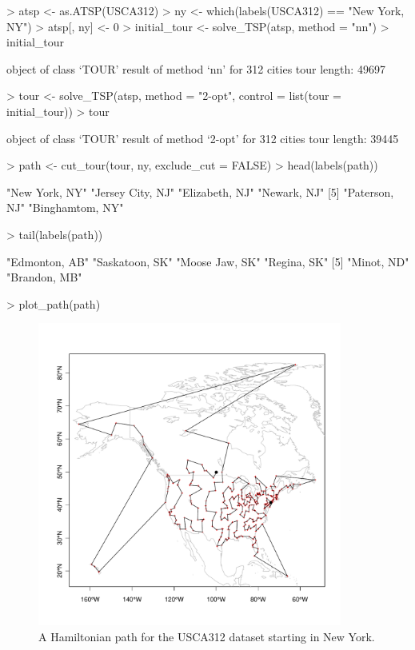 \documentclass[10pt,a4paper,fleqn]{article}
\begin{document}
\begin{Schunk}
\begin{Sinput}
> atsp <- as.ATSP(USCA312)
> ny <- which(labels(USCA312) == "New York, NY")
> atsp[, ny] <- 0
> initial_tour <- solve_TSP(atsp, method = "nn")
> initial_tour
\end{Sinput}
\begin{Soutput}
object of class ‘TOUR’ 
result of method ‘nn’ for 312 cities
tour length: 49697 
\end{Soutput}
\begin{Sinput}
> tour <- solve_TSP(atsp, method = "2-opt", control = list(tour = initial_tour))
> tour
\end{Sinput}
\begin{Soutput}
object of class ‘TOUR’ 
result of method ‘2-opt’ for 312 cities
tour length: 39445 
\end{Soutput}
\begin{Sinput}
> path <- cut_tour(tour, ny, exclude_cut = FALSE)
> head(labels(path))
\end{Sinput}
\begin{Soutput}
[1] "New York, NY"    "Jersey City, NJ" "Elizabeth, NJ"   "Newark, NJ"     
[5] "Paterson, NJ"    "Binghamtom, NY" 
\end{Soutput}
\begin{Sinput}
> tail(labels(path))
\end{Sinput}
\begin{Soutput}
[1] "Edmonton, AB"  "Saskatoon, SK" "Moose Jaw, SK" "Regina, SK"   
[5] "Minot, ND"     "Brandon, MB"  
\end{Soutput}
\end{Schunk}
\begin{Schunk}
\begin{Sinput}
> plot_path(path)
\end{Sinput}
\end{Schunk}

\begin{figure}
\centering
\includegraphics[width=10cm, trim=0 30 0 0]{TSP-map2}
\caption{A Hamiltonian path for the USCA312 dataset starting in New York.}
\label{fig:map2}
\end{figure}
\end{document}
